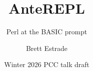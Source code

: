 \documentclass[aspectratio=169,11pt]{beamer}
\title{AnteREPL}
\subtitle{Perl at the BASIC prompt}
\author{Brett Estrade}
\date{Winter 2026 PCC \textemdash{} talk draft}
\begin{document}


\appendix
\renewcommand{\decksection}{Reference}
\renewcommand{\arraystretch}{1.0}

\end{document}
